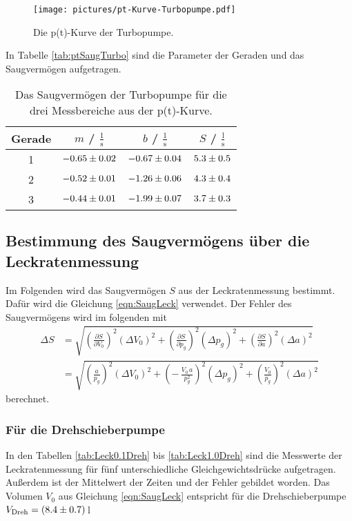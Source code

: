 \begin{figure} %
  \centering
  \texttt{[image: pictures/pt-Kurve-Turbopumpe.pdf]}
  \caption{Die p(t)-Kurve der Turbopumpe.}
  \label{fig:ptturbo}
\end{figure}

In Tabelle \eqref{tab:ptSaugTurbo} sind die Parameter der Geraden und das Saugvermögen aufgetragen.

\begin{table}
  \centering
  \caption{Das Saugvermögen der Turbopumpe für die drei Messbereiche aus der p(t)-Kurve.}
  \label{tab:ptSaugTurbo}
    \begin{tabular}{c|c|c|c}
      Gerade & $m$ / $\frac{1}{\text{s}}$ & $b$ / $\frac{1}{\text{s}}$ & $S$ / $\frac{\text{l}}{\text{s}}$ \\
      \midrule
      1 & $\num{-0.65 +- 0.02}$ & $\num{-0.67 +- 0.04}$ & $\num{5.3 +- 0.5}$\\
      2 & $\num{-0.52 +- 0.01}$ & $\num{-1.26 +- 0.06}$ & $\num{4.3 +- 0.4}$\\
      3 & $\num{-0.44 +- 0.01}$ & $\num{-1.99 +- 0.07}$ & $\num{3.7 +- 0.3}$\\
    \end{tabular}
\end{table}



\subsection{Bestimmung des Saugvermögens über die Leckratenmessung}
Im Folgenden wird das Saugvermögen $S$ aus der Leckratenmessung bestimmt. Dafür wird die Gleichung \eqref{eqn:SaugLeck} verwendet. Der Fehler des Saugvermögens wird im folgenden mit
\begin{align}
  \Delta S &= \sqrt{ \left(\frac{\partial S}{\partial V_0} \right)^2 (\Delta V_0)^2 + \left(\frac{\partial S}{\partial p_g} \right)^2 (\Delta p_g)^2 + \left(\frac{\partial S}{\partial a} \right)^2 (\Delta a)^2 } \nonumber \\
  &= \sqrt{ \left(\frac{a}{p_g} \right)^2 (\Delta V_0)^2 + \left(-\,\frac{V_0\,a}{p_g^2} \right)^2 (\Delta p_g)^2 + \left(\frac{V_0}{p_g} \right)^2 (\Delta a)^2 }
\end{align}
berechnet.

\subsubsection{Für die Drehschieberpumpe}
In den Tabellen \eqref{tab:Leck0.1Dreh} bis \eqref{tab:Leck1.0Dreh} sind die Messwerte der Leckratenmessung für fünf unterschiedliche Gleichgewichtsdrücke aufgetragen. Außerdem ist der Mittelwert der Zeiten und der Fehler gebildet worden. Das Volumen $V_0$ aus Gleichung \eqref{eqn:SaugLeck} entspricht für die Drehschieberpumpe $V_\text{Dreh} = (\num{8.4 +- 0.7})$\,l

